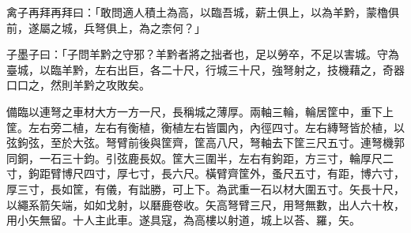 
\begin{pinyinscope}
禽子再拜再拜曰：「敢問適人積土為高，以臨吾城，薪土俱上，以為羊黔，蒙櫓俱前，遂屬之城，兵弩俱上，為之柰何？」

子墨子曰：「子問羊黔之守邪？羊黔者將之拙者也，足以勞卒，不足以害城。守為臺城，以臨羊黔，左右出巨，各二十尺，行城三十尺，強弩射之，技機藉之，奇器口口之，然則羊黔之攻敗矣。

備臨以連弩之車材大方一方一尺，長稱城之薄厚。兩軸三輪，輪居筐中，重下上筐。左右旁二植，左右有衡植，衡植左右皆圜內，內徑四寸。左右縳弩皆於植，以弦鉤弦，至於大弦。弩臂前後與筐齊，筐高八尺，弩軸去下筐三尺五寸。連弩機郭同銅，一石三十鈞。引弦鹿長奴。筐大三圍半，左右有鉤距，方三寸，輪厚尺二寸，鉤距臂博尺四寸，厚七寸，長六尺。橫臂齊筐外，蚤尺五寸，有距，博六寸，厚三寸，長如筐，有儀，有詘勝，可上下。為武重一石以材大圍五寸。矢長十尺，以繩系箭矢端，如如戈射，以磿鹿卷收。矢高弩臂三尺，用弩無數，出人六十枚，用小矢無留。十人主此車。遂具寇，為高樓以射道，城上以荅、羅，矢。


\end{pinyinscope}